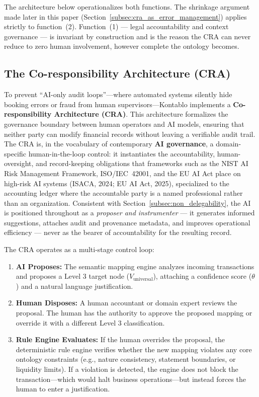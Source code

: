 The architecture below operationalizes both functions. The shrinkage argument
made later in this paper (Section~\ref{subsec:cra_as_error_management}) applies
strictly to function~(2). Function~(1) --- legal accountability and context
governance --- is invariant by construction and is the reason the CRA can
never reduce to zero human involvement, however complete the ontology becomes.

\subsection{The Co-responsibility Architecture (CRA)}
To prevent ``AI-only audit loops''—where automated systems silently hide booking errors or fraud from human supervisors—Kontablo implements a \textbf{Co-responsibility Architecture (CRA)}. This architecture formalizes the governance boundary between human operators and AI models, ensuring that neither party can modify financial records without leaving a verifiable audit trail. The CRA is, in the vocabulary of contemporary \textbf{AI governance}, a domain-specific human-in-the-loop control: it instantiates the accountability, human-oversight, and record-keeping obligations that frameworks such as the NIST AI Risk Management Framework, ISO/IEC~42001, and the EU AI Act place on high-risk AI systems (ISACA, 2024; EU AI Act, 2025), specialized to the accounting ledger where the accountable party is a named professional rather than an organization. Consistent with Section~\ref{subsec:non_delegability}, the AI is positioned throughout as a \emph{proposer and instrumenter} --- it generates informed suggestions, attaches audit and provenance metadata, and improves operational efficiency --- never as the bearer of accountability for the resulting record.

The CRA operates as a multi-stage control loop:
\begin{enumerate}
    \item \textbf{AI Proposes:} The semantic mapping engine analyzes incoming transactions and proposes a Level 3 target node ($V_{\text{universal}}$), attaching a confidence score ($\theta$) and a natural language justification.
    \item \textbf{Human Disposes:} A human accountant or domain expert reviews the proposal. The human has the authority to approve the proposed mapping or override it with a different Level 3 classification.
    \item \textbf{Rule Engine Evaluates:} If the human overrides the proposal, the deterministic rule engine verifies whether the new mapping violates any core ontology constraints (e.g., nature consistency, statement boundaries, or liquidity limits). If a violation is detected, the engine does not block the transaction—which would halt business operations—but instead forces the human to enter a justification.
\end{enumerate}

